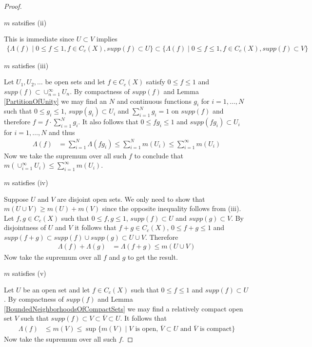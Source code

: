 \begin{proof}
\begin{clm}$m$ satsifies (ii)
\end{clm}

This is immediate since $U \subset V$ implies 
\begin{align*}
\lbrace \Lambda( f ) \mid 0 \leq f \leq 1, f \in C_c(X),
supp(f) \subset U \rbrace \subset \lbrace \Lambda( f ) \mid 0 \leq f \leq 1, f \in C_c(X),
supp(f) \subset V \rbrace
\end{align*}

\begin{clm}$m$ satisfies (iii)
\end{clm}

Let $U_1, U_2, \dotsc$ be open sets and let $f \in C_c(X)$ satisfy $0
\leq f \leq 1$ and $supp(f) \subset \cup_{n=1}^\infty U_n$.  By
compactness of $supp(f)$ and Lemma
\ref{PartitionOfUnity} we may find an $N$ and continuous functions
$g_i$ for $i=1, \dotsc, N$ such that $0 \leq g_i \leq 1$, $supp(g_i) \subset U_i$ and
$\sum_{i=1}^N g_i = 1$ on $supp(f)$ and therefore $f = f \cdot
\sum_{i=1}^N g_i$.  It also follows that $0 \leq f g_i
\leq 1$ and $supp(f g_i) \subset U_i$ for $i=1, \dotsc, N$ and thus
\begin{align*}
\Lambda(f) &= \sum_{i=1}^N \Lambda( f g_i) \leq \sum_{i=1}^N m(U_i)
\leq \sum_{i=1}^\infty m(U_i)
\end{align*}
Now we take the supremum over all such $f$ to conclude that
$m(\cup_{i=1}^\infty U_i) \leq \sum_{i=1}^\infty m(U_i)$.

\begin{clm}$m$ satisfies (iv)
\end{clm}

Suppose $U$ and $V$ are disjoint open sets.  We only need to show that
$m(U \cup V) \geq m(U) + m(V)$ since the opposite inequality follows
from (iii).  Let $f, g \in C_c(X)$ such that $0 \leq f,g \leq 1$,
$supp(f) \subset U$ and $supp(g) \subset V$.  By disjointness of $U$
and $V$ it follows that $f+g \in C_c(X)$, $0 \leq f+g \leq 1$ and
$supp(f+g) \subset supp(f) \cup supp(g) \subset U \cup V$.  Therefore
\begin{align*}
\Lambda(f) + \Lambda(g) &= \Lambda(f+g) \leq m(U \cup V)
\end{align*}
Now take the supremum over all $f$ and $g$ to get the result.

\begin{clm}$m$ satisfies (v)
\end{clm}

Let $U$ be an open set and let $f \in C_c(X)$ such that $0 \leq f \leq
1$ and $supp(f) \subset U$.  By compactness of $supp(f)$ and Lemma
\ref{BoundedNeighborhoodsOfCompactSets} we may find a relatively
compact open set $V$ such that 
$supp(f) \subset V \subset \overline{V} \subset U$.  
It follows that 
\begin{align*}
\Lambda(f) &\leq m(V) \leq \sup \lbrace m(V) \mid V \text{ is open, } \overline{V} \subset U \text{ and }
  \overline{V} \text{ is compact} \rbrace
\end{align*}
Now take the supremum over all such $f$.


\end{proof}
